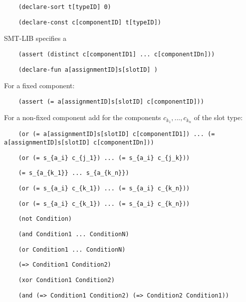 
\begin{verbatim}
	(declare-sort t[typeID] 0)
\end{verbatim}

\begin{verbatim}
	(declare-const c[componentID] t[typeID])
\end{verbatim}

SMT-LIB specifies a  
\begin{verbatim}
	(assert (distinct c[componentID1] ... c[componentIDn]))
\end{verbatim}


\begin{verbatim}
	(declare-fun a[assignmentID]s[slotID] )
\end{verbatim}

For a fixed component:
\begin{verbatim}
	(assert (= a[assignmentID]s[slotID] c[componentID]))
\end{verbatim}

For a non-fixed component add for the components $c_{k_1},...,c_{k_n}$ of the slot type:
\begin{verbatim}
	(or (= a[assignmentID]s[slotID] c[componentID1]) ... (= a[assignmentID]s[slotID] c[componentIDn]))
\end{verbatim}



\begin{verbatim}
	(or (= s_{a_i} c_{j_1}) ... (= s_{a_i} c_{j_k}))
\end{verbatim}


\begin{verbatim}
	(= s_{a_{k_1}} ... s_{a_{k_n}})
\end{verbatim}


\begin{verbatim}
	(or (= s_{a_i} c_{k_1}) ... (= s_{a_i} c_{k_n}))
\end{verbatim}


\begin{verbatim}
	(or (= s_{a_i} c_{k_1}) ... (= s_{a_i} c_{k_n}))
\end{verbatim}


\begin{verbatim}
	(not Condition)
\end{verbatim}


\begin{verbatim}
	(and Condition1 ... ConditionN)
\end{verbatim}


\begin{verbatim}
	(or Condition1 ... ConditionN)
\end{verbatim}


\begin{verbatim}
	(=> Condition1 Condition2)
\end{verbatim}


\begin{verbatim}
	(xor Condition1 Condition2)
\end{verbatim}


\begin{verbatim}
	(and (=> Condition1 Condition2) (=> Condition2 Condition1))
\end{verbatim}